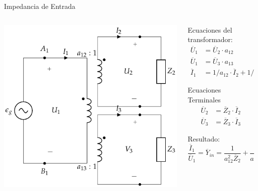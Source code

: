 \documentclass[aspectratio=169, usenames,svgnames,dvipsnames]{beamer}
\begin{document}
\begin{frame}[label={sec:orgfd1fe36}]{Impedancia de Entrada}
\begin{columns}
\begin{column}{0.4\columnwidth}
\begin{center}
\includegraphics[width=.9\linewidth]{../figs/TrafoIdealVariosDevanados_Impedancia.pdf}
\end{center}
\end{column}

\begin{column}{0.6\columnwidth}
Ecuaciones del transformador:
\begin{align*}
  \overline{U}_1 &= \overline{U}_2 \cdot a_{12}\\
  \overline{U}_1 &= \overline{U}_3 \cdot a_{13}\\
  \overline{I}_1 &= 1/a_{12} \cdot \overline{I}_2 + 1/a_{13} \cdot  \overline{I}_3
\end{align*}

Ecuaciones Terminales
\begin{align*}
  \overline{U}_2 &= \overline{Z}_2 \cdot \overline{I}_2\\
  \overline{U}_3 &= \overline{Z}_3 \cdot \overline{I}_3
\end{align*}

Resultado:
\[
  \frac{\overline{I}_1}{\overline{U}_1} = \boxed{\overline{Y}_{in} = \frac{1}{a^2_{12} \overline{Z}_2} +  \frac{1}{a^2_{13} \overline{Z}_3}}
\]
\end{column}
\end{columns}
\end{frame}
\end{document}
